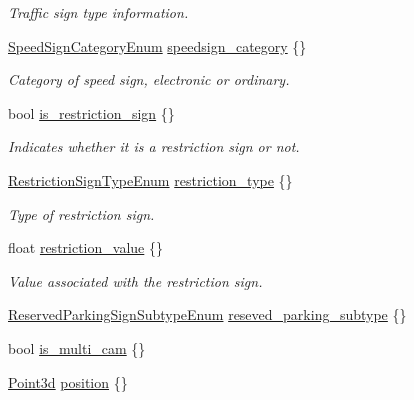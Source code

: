 \begin{DoxyCompactItemize}
\begin{DoxyCompactList}\small\item\em Traffic sign type information. \end{DoxyCompactList}\item 
\hyperlink{structmaf__perception__interface_1_1SpeedSignCategoryEnum}{Speed\+Sign\+Category\+Enum} \hyperlink{structmaf__perception__interface_1_1TrafficSign_ab7ac8a46094081e84a6828f931e07211}{speedsign\+\_\+category} \{\}
\begin{DoxyCompactList}\small\item\em Category of speed sign, electronic or ordinary. \end{DoxyCompactList}\item 
bool \hyperlink{structmaf__perception__interface_1_1TrafficSign_a83f8068684995dc52de2357b39e542e0}{is\+\_\+restriction\+\_\+sign} \{\}
\begin{DoxyCompactList}\small\item\em Indicates whether it is a restriction sign or not. \end{DoxyCompactList}\item 
\hyperlink{structmaf__perception__interface_1_1RestrictionSignTypeEnum}{Restriction\+Sign\+Type\+Enum} \hyperlink{structmaf__perception__interface_1_1TrafficSign_a4b146d93c32699baf4d2e7c1089b9b0e}{restriction\+\_\+type} \{\}
\begin{DoxyCompactList}\small\item\em Type of restriction sign. \end{DoxyCompactList}\item 
float \hyperlink{structmaf__perception__interface_1_1TrafficSign_a01048882b649d179e2ce7a412c2eaa55}{restriction\+\_\+value} \{\}
\begin{DoxyCompactList}\small\item\em Value associated with the restriction sign. \end{DoxyCompactList}\item 
\hyperlink{structmaf__perception__interface_1_1ReservedParkingSignSubtypeEnum}{Reserved\+Parking\+Sign\+Subtype\+Enum} \hyperlink{structmaf__perception__interface_1_1TrafficSign_a7a47e581e68229ac39f9c9ffbb94a6fc}{reseved\+\_\+parking\+\_\+subtype} \{\}
\item 
bool \hyperlink{structmaf__perception__interface_1_1TrafficSign_a20192c5cf4a53fb0f32b95b6f5ac279b}{is\+\_\+multi\+\_\+cam} \{\}
\item 
\hyperlink{structmaf__perception__interface_1_1Point3d}{Point3d} \hyperlink{structmaf__perception__interface_1_1TrafficSign_ae10c97bcba7615211b4cd2d06c25a929}{position} \{\}

\end{DoxyCompactItemize}
